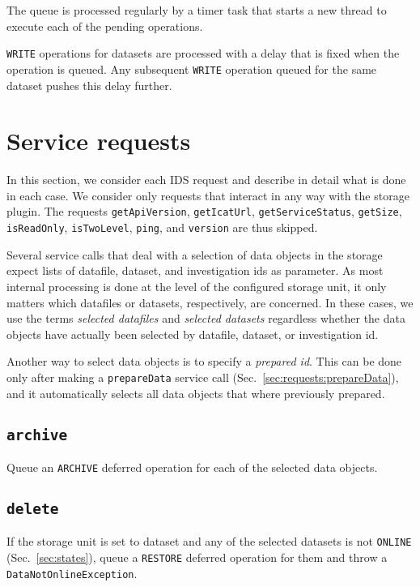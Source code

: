 \documentclass[paper=a4]{scrartcl}
\begin{document}
The queue is processed regularly by a timer task that starts a new
thread to execute each of the pending operations.

\texttt{WRITE} operations for datasets are processed with a delay
that is fixed when the operation is queued.  Any subsequent
\texttt{WRITE} operation queued for the same dataset pushes this
delay further.


\section{Service requests}
\label{sec:requests}

In this section, we consider each IDS request and describe in detail
what is done in each case.  We consider only requests that interact in
any way with the storage plugin.  The requests \texttt{getApiVersion},
\texttt{getIcatUrl}, \texttt{getServiceStatus}, \texttt{getSize},
\texttt{isReadOnly}, \texttt{isTwoLevel}, \texttt{ping}, and
\texttt{version} are thus skipped.

Several service calls that deal with a selection of data objects in
the storage expect lists of datafile, dataset, and investigation ids
as parameter.  As most internal processing is done at the level of the
configured storage unit, it only matters which datafiles or datasets,
respectively, are concerned.  In these cases, we use the terms
\emph{selected datafiles} and \emph{selected datasets} regardless
whether the data objects have actually been selected by datafile,
dataset, or investigation id.

Another way to select data objects is to specify a
\emph{prepared id}.  This can be done only after making a
\texttt{prepareData} service call
(Sec.~\ref{sec:requests:prepareData}), and it automatically
selects all data objects that where previously prepared.

\subsection{\texttt{archive}}

Queue an \texttt{ARCHIVE} deferred operation for each of the selected
data objects.

\subsection{\texttt{delete}}
\label{sec:requests:delete}

If the storage unit is set to dataset and any of the selected
datasets is not \texttt{ONLINE} (Sec.~\ref{sec:states}), queue a
\texttt{RESTORE} deferred operation for them and throw a
\texttt{DataNotOnlineException}.
\end{document}
